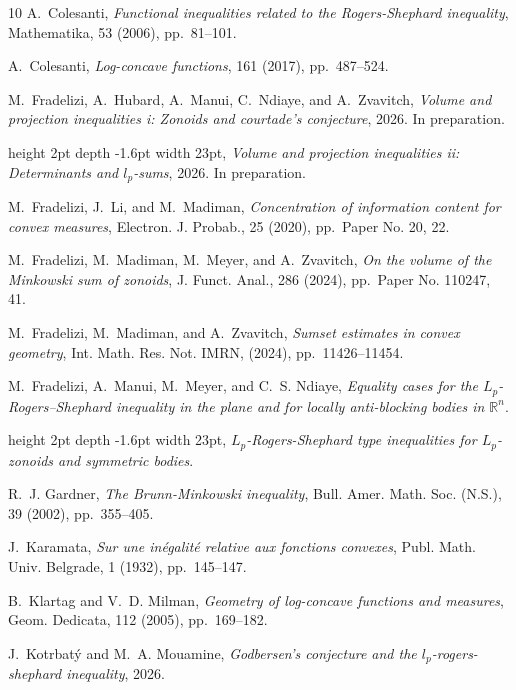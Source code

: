 \documentclass[11pt]{amsart}
\theoremstyle{plain}
\theoremstyle{definition}
\theoremstyle{remark}
\begin{document}
\begin{thebibliography}{10}
{\sc A.~Colesanti}, {\em Functional inequalities related to the {R}ogers-{S}hephard inequality}, Mathematika, 53 (2006), pp.~81--101.

{\sc A.~Colesanti}, {\em Log-concave functions}, 161 (2017), pp.~487--524.

{\sc M.~Fradelizi, A.~Hubard, A.~Manui, C.~Ndiaye, and A.~Zvavitch}, {\em Volume and projection inequalities i: Zonoids and courtade's conjecture}, 2026.
\newblock In preparation.

\leavevmode\vrule height 2pt depth -1.6pt width 23pt, {\em Volume and projection inequalities ii: Determinants and $l_p$-sums}, 2026.
\newblock In preparation.

{\sc M.~Fradelizi, J.~Li, and M.~Madiman}, {\em Concentration of information content for convex measures}, Electron. J. Probab., 25 (2020), pp.~Paper No. 20, 22.

{\sc M.~Fradelizi, M.~Madiman, M.~Meyer, and A.~Zvavitch}, {\em On the volume of the {M}inkowski sum of zonoids}, J. Funct. Anal., 286 (2024), pp.~Paper No. 110247, 41.

{\sc M.~Fradelizi, M.~Madiman, and A.~Zvavitch}, {\em Sumset estimates in convex geometry}, Int. Math. Res. Not. IMRN,  (2024), pp.~11426--11454.

{\sc M.~Fradelizi, A.~Manui, M.~Meyer, and C.~S. Ndiaye}, {\em {E}quality cases for the {$L_p$}-{R}ogers--{S}hephard inequality in the plane and for locally anti-blocking bodies in $\mathbb{R}^n$}.

\leavevmode\vrule height 2pt depth -1.6pt width 23pt, {\em {$L_p$}-{R}ogers-{S}hephard type inequalities for {$L_p$}-zonoids and symmetric bodies}.

{\sc R.~J. Gardner}, {\em The {B}runn-{M}inkowski inequality}, Bull. Amer. Math. Soc. (N.S.), 39 (2002), pp.~355--405.

{\sc J.~Karamata}, {\em Sur une in\'egalit\'e relative aux fonctions convexes}, Publ. Math. Univ. Belgrade, 1 (1932), pp.~145--147.

{\sc B.~Klartag and V.~D. Milman}, {\em Geometry of log-concave functions and measures}, Geom. Dedicata, 112 (2005), pp.~169--182.

{\sc J.~Kotrbatý and M.~A. Mouamine}, {\em Godbersen's conjecture and the $l_p$-rogers-shephard inequality}, 2026.


\end{thebibliography}
\end{document}
